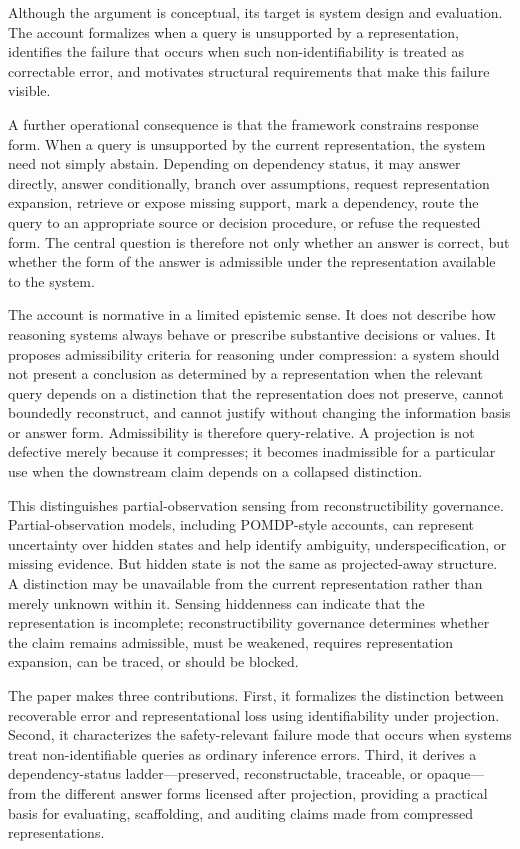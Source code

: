 \documentclass[11pt]{article}
\begin{document}
Although the argument is conceptual, its target is system design and evaluation. The account formalizes when a query is unsupported by a representation, identifies the failure that occurs when such non-identifiability is treated as correctable error, and motivates structural requirements that make this failure visible.

A further operational consequence is that the framework constrains response form. When a query is unsupported by the current representation, the system need not simply abstain. Depending on dependency status, it may answer directly, answer conditionally, branch over assumptions, request representation expansion, retrieve or expose missing support, mark a dependency, route the query to an appropriate source or decision procedure, or refuse the requested form. The central question is therefore not only whether an answer is correct, but whether the form of the answer is admissible under the representation available to the system.

The account is normative in a limited epistemic sense. It does not describe how reasoning systems always behave or prescribe substantive decisions or values. It proposes admissibility criteria for reasoning under compression: a system should not present a conclusion as determined by a representation when the relevant query depends on a distinction that the representation does not preserve, cannot boundedly reconstruct, and cannot justify without changing the information basis or answer form. Admissibility is therefore query-relative. A projection is not defective merely because it compresses; it becomes inadmissible for a particular use when the downstream claim depends on a collapsed distinction.

This distinguishes partial-observation sensing from reconstructibility governance. Partial-observation models, including POMDP-style accounts, can represent uncertainty over hidden states and help identify ambiguity, underspecification, or missing evidence. But hidden state is not the same as projected-away structure. A distinction may be unavailable from the current representation rather than merely unknown within it. Sensing hiddenness can indicate that the representation is incomplete; reconstructibility governance determines whether the claim remains admissible, must be weakened, requires representation expansion, can be traced, or should be blocked.

The paper makes three contributions. First, it formalizes the distinction between recoverable error and representational loss using identifiability under projection. Second, it characterizes the safety-relevant failure mode that occurs when systems treat non-identifiable queries as ordinary inference errors. Third, it derives a dependency-status ladder---preserved, reconstructable, traceable, or opaque---from the different answer forms licensed after projection, providing a practical basis for evaluating, scaffolding, and auditing claims made from compressed representations.
\end{document}
